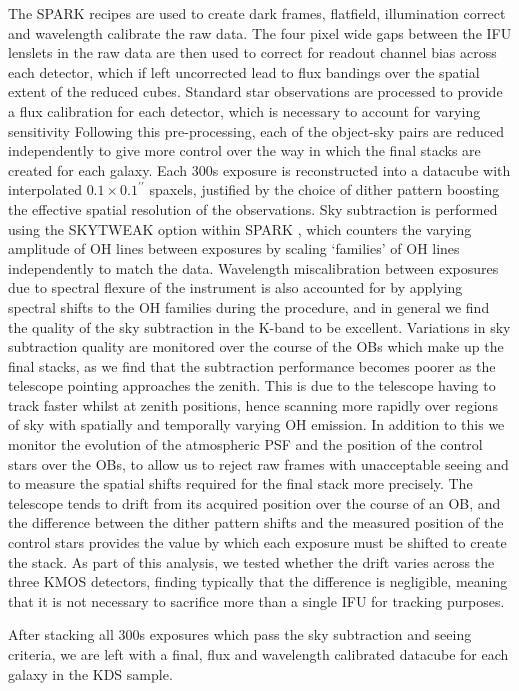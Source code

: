 \documentclass[a4paper,fleqn,usenatbib]{mn2e}
\begin{document}
The SPARK recipes are used to create dark frames, flatfield, illumination correct and wavelength calibrate the raw data.
The four pixel wide gaps between the IFU lenslets in the raw data are then used to correct for readout channel bias across each detector, which if left uncorrected lead to flux bandings over the spatial extent of the reduced cubes.
Standard star observations are processed to provide a flux calibration for each detector, which is necessary to account for varying sensitivity  
Following this pre-processing, each of the object-sky pairs are reduced independently to give more control over the way in which the final stacks are created for each galaxy.
Each 300s exposure is reconstructed into a datacube with interpolated $0.1\times0.1^{\prime\prime}$ spaxels, justified by the choice of dither pattern boosting the effective spatial resolution of the observations.
Sky subtraction is performed using the SKYTWEAK option within SPARK \citep{Davies2007}, which counters the varying amplitude of OH lines between exposures by scaling `families' of OH lines independently to match the data.
Wavelength miscalibration between exposures due to spectral flexure of the instrument is also accounted for by applying spectral shifts to the OH families during the procedure, and in general we find the quality of the sky subtraction in the K-band to be excellent. 
Variations in sky subtraction quality are monitored over the course of the OBs which make up the final stacks, as we find that the subtraction performance becomes poorer as the telescope pointing approaches the zenith.
This is due to the telescope having to track faster whilst at zenith positions, hence scanning more rapidly over regions of sky with spatially and temporally varying OH emission.
In addition to this we monitor the evolution of the atmospheric PSF and the position of the control stars over the OBs, to allow us to reject raw frames with unacceptable seeing and to measure the spatial shifts required for the final stack more precisely.
The telescope tends to drift from its acquired position over the course of an OB, and the difference between the dither pattern shifts and the measured position of the control stars provides the value by which each exposure must be shifted to create the stack.
As part of this analysis, we tested whether the drift varies across the three KMOS detectors, finding typically that the difference is negligible, meaning that it is not necessary to sacrifice more than a single IFU for tracking purposes.

After stacking all 300s exposures which pass the sky subtraction and seeing criteria, we are left with a final, flux and wavelength calibrated datacube for each galaxy in the KDS sample.
\end{document}
